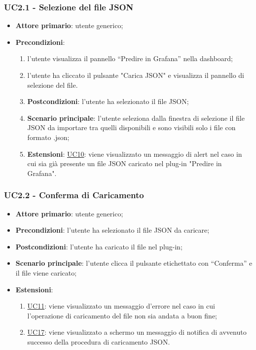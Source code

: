 		
		\label{par:UC2.1}
		\subsubsection{UC2.1 - Selezione del file JSON}
		\begin{itemize}
			\item\textbf{Attore primario}: utente generico;
			\item\textbf{Precondizioni}:
				\begin{enumerate}
					\item l’utente visualizza il pannello “Predire in Grafana” nella dashboard;
					\item l’utente ha cliccato il pulsante "Carica JSON" e visualizza il pannello di selezione del file.
			\item\textbf{Postcondizioni}: l’utente ha selezionato il file JSON;
			\item\textbf{Scenario principale}: l’utente seleziona dalla finestra di selezione il file JSON da importare tra quelli disponibili e sono visibili solo i file con formato .json;
			\item\textbf{Estensioni}: \hyperref[par:UC10]{UC10}: viene visualizzato un messaggio di alert nel caso in cui sia già presente un file JSON caricato nel plug-in "Predire in Grafana".
				\end{enumerate}
			\end{itemize}
		
		\label{par:UC2.2}
		\subsubsection{UC2.2 - Conferma di Caricamento}
		\begin{itemize}
			\item\textbf{Attore primario}: utente generico;
			\item\textbf{Precondizioni}: l’utente ha selezionato il file JSON da caricare;
			\item\textbf{Postcondizioni}: l’utente ha caricato il file nel plug-in;
			\item\textbf{Scenario principale}: l’utente clicca il pulsante etichettato con “Conferma” e il file viene caricato;
			\item\textbf{Estensioni}:
				\begin{enumerate}
					\item\hyperref[par:UC11]{UC11}: viene visualizzato un messaggio d’errore nel caso in cui l’operazione di caricamento del file non sia andata a buon fine;	
					\item\hyperref[par:UC17]{UC17}: viene visualizzato a schermo un messaggio di notifica di avvenuto successo della procedura di caricamento JSON.
				\end{enumerate}	
		\end{itemize}

